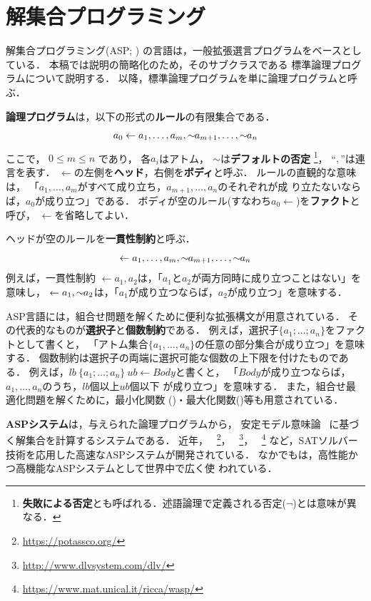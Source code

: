 \chapter{解集合プログラミング}\label{chap:asp}

解集合プログラミング(ASP; \cite{%
  Baral03:cambridge,%
  Gelfond88:iclp,%
  Niemela99:amai,%
  Inoue08:jssst})
の言語は，一般拡張選言プログラムをベースとしている．
本稿では説明の簡略化のため，そのサブクラスである
標準論理プログラムについて説明する．
以降，標準論理プログラムを単に論理プログラムと呼ぶ．

\textbf{論理プログラム}は，以下の形式の\textbf{ルール}の有限集合である．
\begin{equation}
  \label{eq:rule}
  a_0\leftarrow a_1,\dots,a_m,{\sim\!\!{a_{m+1}}},\dots,{\sim\!\!{a_n}}
\end{equation}
ここで，
$0\leq m\leq n$ であり，
各$a_i$はアトム，
${\sim\!\!{}}$は\textbf{デフォルトの否定}
\footnote{\textbf{失敗による否定}とも呼ばれる．述語論理で定義される否定($\neg$)とは意味が異なる．}，
``$,$''は連言を表す．
$\leftarrow$の左側を\textbf{ヘッド}，右側を\textbf{ボディ}と呼ぶ．
ルールの直観的な意味は，
「$a_1,\ldots,a_m$がすべて成り立ち，$a_{m+1},\ldots,a_n$のそれぞれが成
り立たないならば，$a_0$が成り立つ」である．
ボディが空のルール(すなわち\(a_0\leftarrow\))を\textbf{ファクト}と呼び，
$\leftarrow$を省略してよい．

ヘッドが空のルールを\textbf{一貫性制約}と呼ぶ．
\begin{equation}
  \label{eq:constr}
  \leftarrow a_1,\dots,a_m,{\sim\!\!{a_{m+1}}},\dots,{\sim\!\!{a_n}}
\end{equation}
例えば，一貫性制約
\(\leftarrow a_1,a_2\)は，「$a_1$と$a_2$が両方同時に成り立つことはない」を意味し，
\(\leftarrow a_1, {\sim\!\!{a_{2}}}\)は，「$a_1$が成り立つならば，$a_2$が成り立つ」を意味する．

ASP言語には，組合せ問題を解くために便利な拡張構文が用意されている．
その代表的なものが\textbf{選択子}と\textbf{個数制約}である．
例えば，選択子\(\{a_1;\dots;a_n\}\)をファクトとして書くと，
「アトム集合\(\{a_1,\dots,a_n\}\)の任意の部分集合が成り立つ」を意味する．
個数制約は選択子の両端に選択可能な個数の上下限を付けたものである．
例えば，\(lb\ \{a_1;\dots;a_n\}\ ub \leftarrow Body\)と書くと，
「$Body$が成り立つならば，$a_1,\dots,a_n$のうち，$lb$個以上$ub$個以下
が成り立つ」を意味する．
また，組合せ最適化問題を解くために，最小化関数
()・最大化関数()等も用意されている．

\textbf{ASPシステム}は，与えられた論理プログラムから，
安定モデル意味論~\cite{Gelfond88:iclp}
に基づく解集合を計算するシステムである．
近年，
{\clingo}~\footnote{\url{https://potassco.org/}}，
{\dlv}~\footnote{\url{http://www.dlvsystem.com/dlv/}}，
{\wasp}~\footnote{\url{https://www.mat.unical.it/ricca/wasp/}}
など，SATソルバー技術を応用した高速なASPシステムが開発されている．
なかでも{\clingo}は，高性能かつ高機能なASPシステムとして世界中で広く使
われている．

